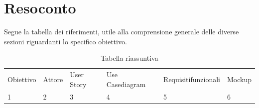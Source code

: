 \documentclass{article}
\begin{document}
\clearpage

\section{Resoconto}

Segue la tabella dei riferimenti, utile alla comprensione generale delle diverse sezioni riguardanti lo specifico obiettivo.\\

\begin{table}[htbp]
    \centering
    \begin{tabularx}{\textwidth}{|X|X|X|X|X|X|}
        \Xhline{2pt} %
        Obiettivo & Attore & User Story & Use Case\newline diagram & Requisiti\newline funzionali & Mockup \\
        \Xhline{2pt} %
        1 & 2 & 3 & 4 & 5 & 6 \\
        \hline
    \end{tabularx}
    \caption{Tabella riassuntiva}
    \label{tab:tabella_tutta_pagina}
\end{table}
\end{document}
